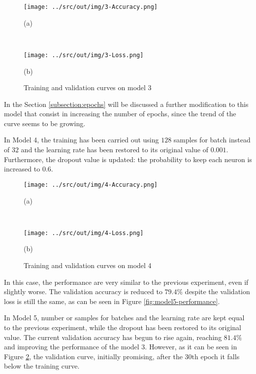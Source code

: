 \documentclass[a4paper,12pt]{article} %
\begin{document}
	\begin{figure}[htb]
		\begin{minipage}[c]{.49\textwidth}
			\centering
			\texttt{[image: ../src/out/img/3-Accuracy.png]}
			\caption*{(a)}
		\end{minipage}
		~
		\begin{minipage}[c]{.49\textwidth}
			\centering
			\texttt{[image: ../src/out/img/3-Loss.png]}
			\caption*{(b)}
		\end{minipage}
		\caption{Training and validation curves on model 3}
		\label{fig:model3-performance}
	\end{figure}
		
	In the Section \ref{subsection:epochs} will be discussed a further 
	modification to this model that consist in increasing the number of 
	epochs, since the trend of the curve seems to be growing.
	\newline 
	
	In Model 4, the training has been carried out using $128$ samples 
	for batch instead of $32$ and the learning rate has been restored to its 
	original value of $0.001$. 
	Furthermore, the dropout value is updated: the probability to keep each 
	neuron is increased to $0.6$. 
		
	\begin{figure}[htb]
		\begin{minipage}[c]{.49\textwidth}
			\centering
			\texttt{[image: ../src/out/img/4-Accuracy.png]}
			\caption*{(a)}
		\end{minipage}
		~
		\begin{minipage}[c]{.49\textwidth}
			\centering
			\texttt{[image: ../src/out/img/4-Loss.png]}
			\caption*{(b)}
		\end{minipage}
		\caption{Training and validation curves on model 4}
		\label{fig:model4-performance}
	\end{figure}

	In this case, the performance are very similar to the previous experiment, 
	even if slightly worse. The validation accuracy is reduced to 
	$79.4\%$ despite the validation loss is still the same, as can be seen in 
	Figure \ref*{fig:model5-performance}.
	\newline
	
	In Model 5, number or samples for batches and the learning rate are kept 
	equal to the previous experiment, while the dropout has been restored to 
	its original value. 
	The current validation accuracy has begun to rise again, reaching $81.4\%$ 
	and improving the performance of the model 3. However, as it can be seen in 
	Figure \ref{fig:model4-performance}, the validation curve, initially 
	promising, after the $30\mathrm{th}$ epoch it falls below the training 
	curve.
\end{document}
